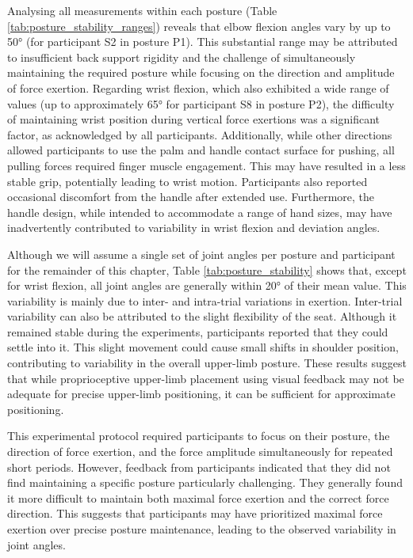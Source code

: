 Analysing all measurements within each posture (Table \ref{tab:posture_stability_ranges}) reveals that elbow flexion angles vary by up to 50° (for participant S2 in posture P1). This substantial range may be attributed to insufficient back support rigidity and the challenge of simultaneously maintaining the required posture while focusing on the direction and amplitude of force exertion.  
Regarding wrist flexion, which also exhibited a wide range of values (up to approximately 65° for participant S8 in posture P2), the difficulty of maintaining wrist position during vertical force exertions was a significant factor, as acknowledged by all participants. Additionally, while other directions allowed participants to use the palm and handle contact surface for pushing, all pulling forces required finger muscle engagement. This may have resulted in a less stable grip, potentially leading to wrist motion. Participants also reported occasional discomfort from the handle after extended use.  Furthermore, the handle design, while intended to accommodate a range of hand sizes, may have inadvertently contributed to variability in wrist flexion and deviation angles.

Although we will assume a single set of joint angles per posture and participant for the remainder of this chapter, Table \ref{tab:posture_stability} shows that, except for wrist flexion, all joint angles are generally within 20° of their mean value. This variability is mainly due to inter- and intra-trial variations in exertion. Inter-trial variability can also be attributed to the slight flexibility of the seat. Although it remained stable during the experiments, participants reported that they could settle into it. This slight movement could cause small shifts in shoulder position, contributing to variability in the overall upper-limb posture. These results suggest that while proprioceptive upper-limb placement using visual feedback may not be adequate for precise upper-limb positioning, it can be sufficient for approximate positioning.

This experimental protocol required participants to focus on their posture, the direction of force exertion, and the force amplitude simultaneously for repeated short periods. However, feedback from participants indicated that they did not find maintaining a specific posture particularly challenging. They generally found it more difficult to maintain both maximal force exertion and the correct force direction. This suggests that participants may have prioritized maximal force exertion over precise posture maintenance, leading to the observed variability in joint angles.



